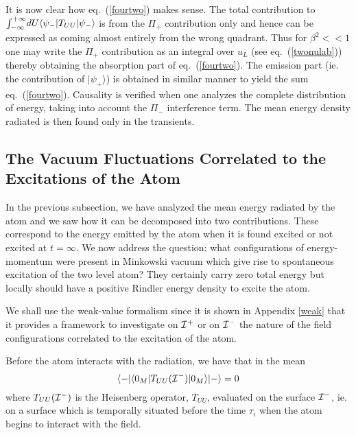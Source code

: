 \documentclass[12pt,oneside]{report}
\def\ket#1{|#1\rangle}
\def\bra#1{\langle #1|}
\def\elematrice#1#2#3{\langle #1|#2|#3 \rangle}
\begin{document}
It is now clear how eq.~(\ref{fourtwo}) makes sense. The total contribution to 
$\int_{-\infty}^{+\infty} \! dU \break \elematrice{\psi_-} { T_{UU} }{\psi_-}$
is from the $\Pi_+$ contribution only
and hence can be expressed as coming
almost entirely from
the wrong quadrant. 
Thus for $\beta^2 <<1$ one may write the $\Pi_+$ contribution as an integral
over $u_L$ (see eq.~(\ref{twonulab})) thereby obtaining 
the absorption part
of eq.~(\ref{fourtwo}). The emission part (ie. the contribution of
$\ket{\psi_+}$) is obtained in similar manner to yield the sum
eq.~(\ref{fourtwo}). Causality is verified when one analyzes the complete
distribution of energy, taking into account the $\Pi_-$ interference term. The
mean energy density radiated is then found only in the transients.



\subsection{The Vacuum Fluctuations Correlated to the Excitations of the Atom}
\label{weakacc}

In the previous subsection, we have analyzed the mean energy radiated by the
atom and we saw how it can be decomposed into two contributions. These
correspond to the energy emitted by the atom when it is found  excited or not
excited at $t=\infty$. We now address the
question: what configurations of energy-momentum 
were
present in Minkowski vacuum which
give rise to spontaneous excitation of the two level atom? 
They certainly carry zero
total energy but locally should
have a positive Rindler energy density to excite the
atom.

We shall use the weak-value formalism since
it is shown in Appendix \ref{weak} that it
provides a framework 
to investigate on ${\cal{I^+}}$ or on ${\cal{I^-}}$ 
the nature of the field configurations
correlated to the excitation of the atom.

Before the atom interacts with the radiation, we have that in the mean
\begin{equation}
\bra{-} \elematrice{0_M}{T_{UU}({\cal{I^-}})}{0_M } \ket{-}=0
\end{equation}
where 
$T_{UU}({\cal{I^-}})$ is the Heisenberg operator, $T_{UU}$, evaluated on the surface
${\cal I}^-$, ie. on a surface which is temporally situated before the time $\tau_i$
when the atom begins to interact with the field. 
\end{document}
